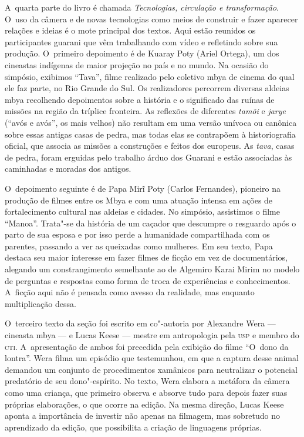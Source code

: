 A~quarta parte do livro é chamada \emph{Tecnologias, circulação e
transformação}. O~uso da câmera e de novas tecnologias como meios de
construir e fazer aparecer relações e ideias é o mote principal dos
textos. Aqui estão reunidos os participantes guarani que vêm
trabalhando com vídeo e refletindo sobre sua produção. O~primeiro
depoimento é de Kuaray Poty (Ariel Ortega), um dos cineastas indígenas
de maior projeção no país e no mundo. Na ocasião do simpósio, exibimos
``Tava'', filme realizado pelo coletivo mbya de cinema do qual ele faz
parte, no Rio Grande do Sul. Os realizadores percorrem diversas aldeias
mbya recolhendo depoimentos sobre a história e o significado das ruínas
de missões na região da tríplice fronteira. As reflexões de diferentes
\emph{tamõi} e \emph{jarye} (``avós e avós'', os mais velhos) não resultam em uma
versão unívoca ou canônica sobre essas antigas casas de pedra, mas
todas elas se contrapõem à historiografia oficial, que associa as
missões a construções e feitos dos europeus. As \emph{tava}, casas de pedra,
foram erguidas pelo trabalho árduo dos Guarani e estão associadas às
caminhadas e moradas dos antigos. 

O~depoimento seguinte é de Papa Mirĩ Poty (Carlos
Fernandes), pioneiro na produção de filmes entre os Mbya e com uma
atuação intensa em ações de fortalecimento cultural nas aldeias e
cidades. No simpósio, assistimos o filme ``Manoa''. Trata"-se da história
de um caçador que descumpre o resguardo após o parto de sua esposa e
por isso perde a humanidade compartilhada com os parentes, passando a
ver as queixadas como mulheres. Em seu texto, Papa destaca seu maior
interesse em fazer filmes de ficção em vez de documentários, alegando
um constrangimento semelhante ao de Algemiro Karai Mirim no modelo de
perguntas e respostas como forma de troca de experiências e
conhecimentos. A~ficção aqui não é pensada como avesso da realidade,
mas enquanto multiplicação dessa. 

O~terceiro texto da seção foi escrito em co"-autoria por Alexandre Wera ---
cineasta mbya --- e Lucas Keese --- mestre em antropologia pela \textsc{usp} e
membro do \textsc{cti}. A~apresentação de ambos foi precedida pela exibição do
filme ``O~dono da lontra''. Wera filma um episódio que testemunhou, em
que a captura desse animal demandou um conjunto de procedimentos
xamânicos para neutralizar o potencial predatório de seu dono"-espírito.
No texto, Wera elabora a metáfora da câmera como uma criança, que
primeiro observa e absorve tudo para depois fazer suas próprias
elaborações, o que ocorre na edição. Na mesma direção, Lucas Keese
aponta a importância de investir não apenas na filmagem, mas sobretudo
no aprendizado da edição, que possibilita a criação de linguagens
próprias. 

